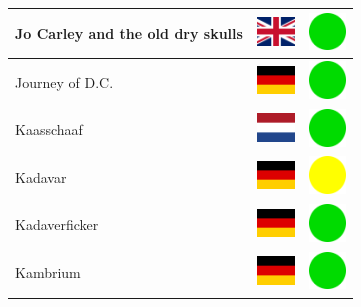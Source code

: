 \documentclass[12pt, a4paper, twoside]{report}
\begin{document}
\begin{center}
\begin{longtable}{|p{5cm}|p{2cm}|p{2cm}|}
 Jo Carley and the old dry skulls                           & \includegraphics[width=1cm]{../4x3/gb} &   \includegraphics[width=1cm]{../likes/y} \\ \hline
 Journey of D.C.                                            & \includegraphics[width=1cm]{../4x3/de} &   \includegraphics[width=1cm]{../likes/y} \\ \hline
 Kaasschaaf                                                 & \includegraphics[width=1cm]{../4x3/nl} &   \includegraphics[width=1cm]{../likes/y} \\ \hline
 Kadavar                                                    & \includegraphics[width=1cm]{../4x3/de} &   \includegraphics[width=1cm]{../likes/m} \\ \hline
 Kadaverficker                                              & \includegraphics[width=1cm]{../4x3/de} &   \includegraphics[width=1cm]{../likes/y} \\ \hline
 Kambrium                                                   & \includegraphics[width=1cm]{../4x3/de} &   \includegraphics[width=1cm]{../likes/y} \\ \hline

\end{longtable}
\end{center}
\end{document}
